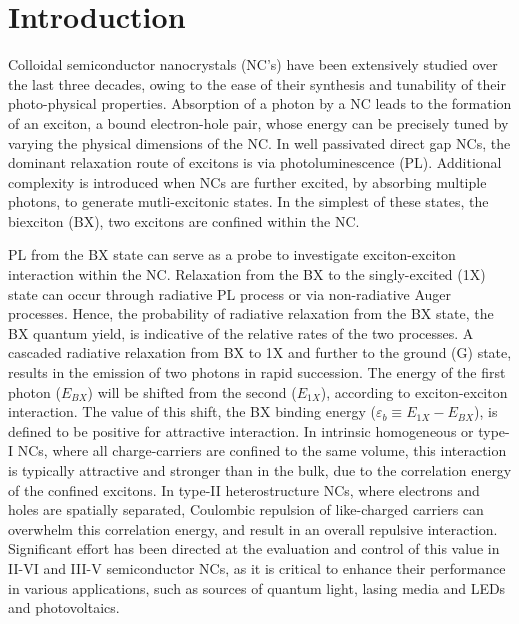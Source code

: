 \documentclass[journal=nalefd, manuscript=letter, layout=twocolumn]{achemso}
\begin{document}
\section*{Introduction}
Colloidal semiconductor nanocrystals (NC’s) have been extensively studied over the last three decades, owing to the ease of their synthesis and tunability of their photo-physical properties\cite{Efros2021}. Absorption of a photon by a NC leads to the formation of an exciton, a bound electron-hole pair, whose energy can be precisely tuned by varying the physical dimensions of the NC\cite{Brus1984}. In well passivated direct gap NCs, the dominant relaxation route of excitons is via photoluminescence (PL). Additional complexity is introduced when NCs are further excited, by absorbing multiple photons, to generate mutli-excitonic states. In the simplest of these states, the biexciton (BX), two excitons are confined within the NC.

PL from the BX state can serve as a probe to investigate exciton-exciton interaction within the NC. Relaxation from the BX to the singly-excited (1X) state can occur through radiative PL process or via non-radiative Auger processes\cite{Melnychuk2021}. Hence, the probability of radiative relaxation from the BX state, the BX quantum yield, is indicative of the relative rates of the two processes. A cascaded radiative relaxation from BX to 1X and further to the ground (G) state, results in the emission of two photons in rapid succession. The energy of the first photon ($E_{BX}$) will be shifted from the second ($E_{1X}$), according to exciton-exciton interaction. The value of this shift, the BX binding energy ($\varepsilon_b \equiv E_{1X} - E_{BX}$), is defined to be positive for attractive interaction. In intrinsic homogeneous or type-I NCs, where all charge-carriers are confined to the same volume, this interaction is typically attractive and stronger than in the bulk, due to the correlation energy of the confined excitons. In type-II heterostructure NCs, where electrons and holes are spatially separated, Coulombic repulsion of like-charged carriers can overwhelm this correlation energy, and result in an overall repulsive interaction\cite{Oron2007}. Significant effort has been directed at the evaluation and control of this value in II-VI and III-V semiconductor NCs, as it is critical to enhance their performance in various applications, such as sources of quantum light\cite{Senellart2017}, lasing media and LEDs\cite{Melnychuk2021} and photovoltaics\cite{Kramer2011}.
\end{document}
